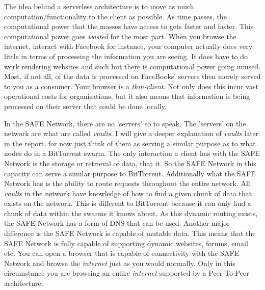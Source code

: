 The idea behind a serverless architecture is to move as much computation/functionality to the client as possible. As time passes, the computational power that the masses have access to gets faster and faster. This computational power goes \textit{wasted} for the most part. When you browse the internet, interact with Facebook for instance, your computer actually does very little in terms of processing the information you are seeing. It does have to do work rendering websites and such but there is computational power going unused. Most, if not all, of the data is processed on FaceBooks' servers then merely served to you as a consumer. Your browser is a \textit{thin-client}. Not only does this incur vast operational costs for organisations, but it also means that information is being processed on their server that could be done locally.

In the SAFE Network, there are no 'servers' so to speak. The 'servers' on the network are what are called \textit{vaults}. I will give a deeper explanation of \textit{vaults} later in the report, for now just think of them as serving a similar purpose as to what nodes do in a BitTorrent swarm.  The only interaction a client has with the SAFE Network is the storage or retrieval of data, that it. So the SAFE Network in this capacity can serve a similar purpose to BitTorrent. Additionally what the SAFE Network has is the ability to route requests throughout the entire network. All \textit{vaults} in the network have knowledge of how to find a given chunk of data that exists on the network. This is different to BitTorrent because it can only find a chunk of data within the swarms it knows about. As this dynamic routing exists, the SAFE Network has a form of DNS that can be used. Another major difference is the SAFE Network is capable of mutable data. This means that the SAFE Network is fully capable of supporting dynamic websites, forums, email etc. You can open a browser that is capable of connectivity with the SAFE Network and browse the \textit{internet} just as you would normally. Only in this circumstance you are browsing an entire \textit{internet} supported by a Peer-To-Peer architecture.

